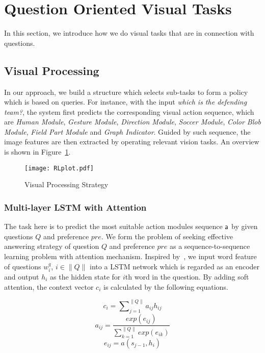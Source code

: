 \section{Question Oriented Visual Tasks}
\label{sec-reinforcement-learning}
In this section, we introduce how we do visual tasks that are in connection with questions. 




\subsection{Visual Processing}

In our approach, we build a structure which selects sub-tasks to form a policy which is based on queries. For instance, with the input \textit{which is the defending team?}, the system first predicts the corresponding visual action sequence, which are \textit{Human Module}, \textit{Gesture Module}, \textit{Direction Module}, \textit{Soccer Module}, \textit{Color Blob Module}, \textit{Field Part Module} and \textit{Graph Indicator}. Guided by such sequence, the image features are then extracted by operating relevant vision tasks. An overview is shown in Figure~\ref{fig:RLplot}.

\label{sec-visual-processing}
\begin{figure}[h]
\begin{center}
\texttt{[image: RLplot.pdf]}
\end{center}
\caption{Visual Processing Strategy}
\label{fig:RLplot}
\end{figure}

\subsubsection{Multi-layer LSTM with Attention}
\label{sec-LSTM}
\hspace{\parindent}The task here is to predict the most suitable action modules sequence ${\mathsf{a}}$ by given questions $Q$ and preference $pre$. We form the problem of seeking effective answering strategy of question $Q$ and preference $pre$ as a sequence-to-sequence learning problem with attention mechanism. Inspired by~\cite{Bahdanau2016}, we input word feature of questions $w_i^q$, $i\in\|Q\|$ into a LSTM network which is regarded as an encoder and output $h_i$ as the hidden state for $i$th word in the question. By adding soft attention, the context vector $c_i$ is calculated by the following equations.


\begin{small}
\begin{equation} 
    c_i= \sum\nolimits_{j=1}^{\|Q\|} a_{ij}h_{ij}
\end{equation}
\begin{equation} 
    a_{ij}= \frac{exp(e_{ij})}{\sum\nolimits_{k=1}^{\|Q\|} exp(e_{ik})}
\end{equation}
\begin{equation} 
    e_{ij}= a(s_{j-1},h_i)
\end{equation}
\end{small}

